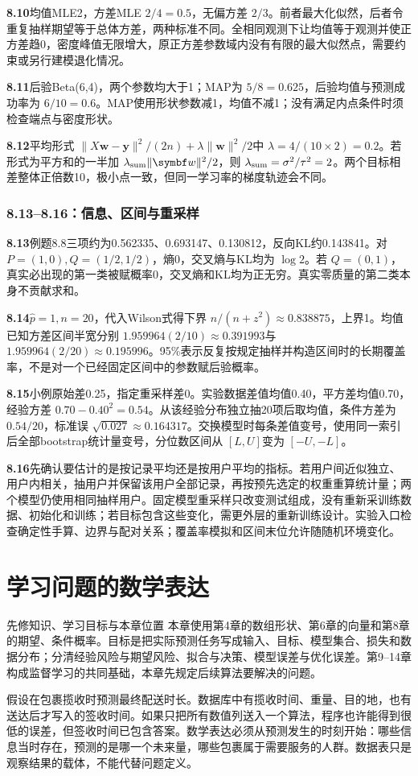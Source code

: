 \documentclass[UTF8,fontset=none,zihao=-4,a4paper]{ctexart}
\newcommand{\chapterpage}[1]{\clearpage\section{#1}}
\numberwithin{equation}{section}
\numberwithin{figure}{section}
\begin{document}
\textbf{8.10}\quad 均值MLE2，方差MLE $2/4=0.5$，无偏方差 $2/3$。前者最大化似然，后者令重复抽样期望等于总体方差，两种标准不同。全相同观测下让均值等于观测并使正方差趋0，密度峰值无限增大，原正方差参数域内没有有限的最大似然点，需要约束或另行建模退化情况。

\textbf{8.11}\quad 后验Beta(6,4)，两个参数均大于1；MAP为 $5/8=0.625$，后验均值与预测成功率为 $6/10=0.6$。MAP使用形状参数减1，均值不减1；没有满足内点条件时须检查端点与密度形状。

\textbf{8.12}\quad 平均形式 $\|X\symbf w-\symbf y\|^2/(2n)+\lambda\|\symbf w\|^2/2$中 $\lambda=4/(10\times2)=0.2$。若形式为平方和的一半加 $\lambda_{\rm sum}\|\symbf w\|^2/2$，则 $\lambda_{\rm sum}=\sigma^2/\tau^2=2$。两个目标相差整体正倍数10，极小点一致，但同一学习率的梯度轨迹会不同。

\subsubsection*{8.13--8.16：信息、区间与重采样}
\textbf{8.13}\quad 例题8.8三项约为0.562335、0.693147、0.130812，反向KL约0.143841。对 $P=(1,0),Q=(1/2,1/2)$，熵0，交叉熵与KL均为 $\log2$。若 $Q=(0,1)$，真实必出现的第一类被赋概率0，交叉熵和KL均为正无穷。真实零质量的第二类本身不贡献求和。

\textbf{8.14}\quad $\hat p=1,n=20$，代入Wilson式得下界 $n/(n+z^2)\approx0.838875$，上界1。均值已知方差区间半宽分别 $1.959964(2/10)\approx0.391993$与 $1.959964(2/20)\approx0.195996$。95\%表示反复按规定抽样并构造区间时的长期覆盖率，不是对一个已经固定区间中的参数赋后验概率。

\textbf{8.15}\quad 小例原始差0.25，指定重采样差0。实验数据差值均值0.40，平方差均值0.70，经验方差 $0.70-0.40^2=0.54$。从该经验分布独立抽20项后取均值，条件方差为 $0.54/20$，标准误 $\sqrt{0.027}\approx0.164317$。交换模型时每条差值变号，使用同一索引后全部bootstrap统计量变号，分位数区间从 $[L,U]$变为 $[-U,-L]$。

\textbf{8.16}\quad 先确认要估计的是按记录平均还是按用户平均的指标。若用户间近似独立、用户内相关，抽用户并保留该用户全部记录，再按预先选定的权重重算统计量；两个模型仍使用相同抽样用户。固定模型重采样只改变测试组成，没有重新采训练数据、初始化和训练；若目标包含这些变化，需更外层的重新训练设计。实验入口检查确定性手算、边界与配对关系；覆盖率模拟和区间末位允许随随机环境变化。

\chapterpage{学习问题的数学表达}\label{ch:learning-problem}
\begin{infobox}{先修知识、学习目标与本章位置}
本章使用第4章的数组形状、第6章的向量和第8章的期望、条件概率。目标是把实际预测任务写成输入、目标、模型集合、损失和数据分布；分清经验风险与期望风险、拟合与决策、模型误差与优化误差。第9--14章构成监督学习的共同基础，本章先规定后续算法要解决的问题。
\end{infobox}
假设在包裹揽收时预测最终配送时长。数据库中有揽收时间、重量、目的地，也有送达后才写入的签收时间。如果只把所有数值列送入一个算法，程序也许能得到很低的误差，但签收时间已包含答案。数学表达必须从预测发生的时刻开始：哪些信息当时存在，预测的是哪一个未来量，哪些包裹属于需要服务的人群。数据表只是观察结果的载体，不能代替问题定义。
\end{document}
